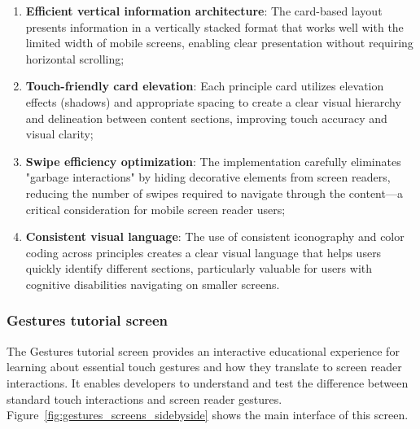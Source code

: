 \begin{enumerate}
    \item \textbf{Efficient vertical information architecture}: The card-based layout presents information in a vertically stacked format that works well with the limited width of mobile screens, enabling clear presentation without requiring horizontal scrolling;
    
    \item \textbf{Touch-friendly card elevation}: Each principle card utilizes elevation effects (shadows) and appropriate spacing to create a clear visual hierarchy and delineation between content sections, improving touch accuracy and visual clarity;
    
    \item \textbf{Swipe efficiency optimization}: The implementation carefully eliminates "garbage interactions" by hiding decorative elements from screen readers, reducing the number of swipes required to navigate through the content—a critical consideration for mobile screen reader users;
    
    \item \textbf{Consistent visual language}: The use of consistent iconography and color coding across principles creates a clear visual language that helps users quickly identify different sections, particularly valuable for users with cognitive disabilities navigating on smaller screens.
\end{enumerate}

\subsubsection{Gestures tutorial screen}
\label{subsubsec:gestures-tutorial}

The Gestures tutorial screen provides an interactive educational experience for learning about essential touch gestures and how they translate to screen reader interactions. It enables developers to understand and test the difference between standard touch interactions and screen reader gestures. Figure~\ref{fig:gestures_screens_sidebyside} shows the main interface of this screen.

